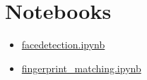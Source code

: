 \section{Notebooks}\label{notebooks}

\begin{itemize}
\tightlist
\item
  \href{https://github.com/cloudmesh/classes/blob/master/docs/source/notebooks/facedetection.ipynb}{facedetection.ipynb}
\item
  \href{https://github.com/cloudmesh/classes/blob/master/docs/source/notebooks/fingerprint_matching.ipynb}{fingerprint\_matching.ipynb}
\end{itemize}
